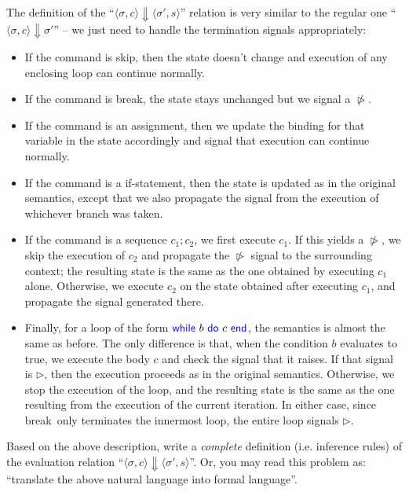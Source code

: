 \documentclass[11pt,a4paper]{article}
\let\sCont\triangleright
\let\sBreak\ntriangleright
\newcommand{\pair}[1]{\langle #1 \rangle}
\newcommand{\evalC}[3]{\pair{#1, #2} \Downarrow #3}
\newcommand{\evalCsig}[4]{\pair{#1, #2} \Downarrow \pair{#3, #4}}
\newcommand{\kword}[1]{{\color{blue} \textsf{#1}}}
\newcommand{\Skip}{\kword{skip}}
\newcommand{\While}{\kword{while}}
\newcommand{\Do}{\kword{do}}
\newcommand{\End}{\kword{end}}
\newcommand{\Break}{\kword{break}}
\begin{document}
The definition of the ``$\evalCsig{\sigma}{c}{\sigma'}{s}$'' relation is very similar to the regular one ``$\evalC{\sigma}{c}{\sigma'}$'' -- we just need to handle the termination signals appropriately:
\begin{itemize}
	\item If the command is \Skip, then the state doesn't change and execution of any enclosing loop can continue normally.
	\item If the command is \Break, the state stays unchanged but we signal a $\sBreak$.
	\item If the command is an assignment, then we update the binding for that variable in the state accordingly and signal that execution can continue normally.
	\item If the command is a if-statement, then the state is updated as in the original semantics,
	except that we also propagate the signal from the execution of whichever branch was taken.
	\item If the command is a sequence $c_1;c_2$, we first execute $c_1$.
	If this yields a $\sBreak$, we skip the execution of $c_2$ and propagate the $\sBreak$ signal to the surrounding context;
	the resulting state is the same as the one obtained by executing $c_1$ alone.
	Otherwise, we execute $c_2$ on the state obtained after executing $c_1$,
	and propagate the signal generated there.
	\item Finally, for a loop of the form $\While~b~\Do~c~\End$, the semantics is almost the same as before.
	The only difference is that, when the condition $b$ evaluates to true, we execute the body $c$ and check the signal that it raises.
	If that signal is $\sCont$, then the execution proceeds as in the original semantics.
	Otherwise, we stop the execution of the loop,
	and the resulting state is the same as the one resulting from the execution of the current iteration.
	In either case, since \Break~only terminates the innermost loop, the entire loop signals $\sCont$.
\end{itemize}

\subproblem Based on the above description, write a \emph{complete} definition (i.e. inference rules) of the evaluation relation ``$\evalCsig{\sigma}{c}{\sigma'}{s}$''.
Or, you may read this problem as: ``translate the above natural language into formal language''.
\end{document}
